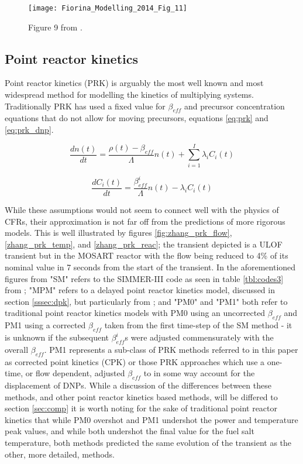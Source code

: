 \documentclass[review]{elsarticle}
\begin{document}
\begin{figure}[h]
   \centering
   \texttt{[image: Fiorina\_Modelling\_2014\_Fig\_11]}
   \caption{Figure 9 from \cite{fiorina_modelling_2014}.} 
   \label{fig:fiorina_msfr_ulof}
\end{figure}

\subsection{Point reactor kinetics} \label{ssec:prk}
Point reactor kinetics (PRK) is arguably the most well known and most widespread
method for modelling the kinetics of multiplying systems. Traditionally PRK
has used a fixed value for $\beta_{eff}$ and precursor concentration equations
that do not allow for moving precursors, equations \ref{eq:prk} and
\ref{eq:prk_dnp}.

\begin{equation}
    \label{eq:prk}
    \frac{dn(t)}{dt} = \frac{\rho(t) - \beta_{eff}}{\Lambda} n(t) +
     \sum_{i = 1}^{I} \lambda_{i} C_{i}(t)
\end{equation}

\begin{equation}
    \label{eq:prk_dnp}
    \frac{dC_{i}(t)}{dt} = \frac{\beta_{eff}^{i}}{\Lambda} n(t) -
        \lambda_{i} C_{i}(t)
\end{equation}

While these assumptions would not seem to connect well
with the physics of CFRs, their approximation is not far off from the
predictions of more rigorous models. This is well illustrated by figures
\ref{fig:zhang_prk_flow}, \ref{zhang_prk_temp}, and \ref{zhang_prk_reac};
the transient depicted is a ULOF transient but in the MOSART reactor with the
flow being reduced to 4\% of its nominal value in 7 seconds from the start
of the transient. In
the aforementioned figures from \cite{zhang_comparison_2009} "SM" refers
to the SIMMER-III code as seen in table \ref{tbl:codes3} from
\cite{rineiski_kinetics_2005}; "MPM" refers to a delayed point reactor kinetics
model, discussed in section \ref{sssec:dpk}, but particularly from
\cite{suzuki_reactivity-initiated-accident_2008}; and "PM0" and "PM1" both
refer to traditional point reactor kinetics models with PM0 using an
uncorrected $\beta_{eff}$ and PM1 using a corrected $\beta_{eff}$ taken from
the first time-step of the SM method - it is unknown if the subsequent
$\beta_{eff}^{i}$s were adjusted commensurately with the overall $\beta_{eff}$.
PM1 represents a sub-class of PRK methods referred to in this paper as
corrected point kinetics (CPK) or those PRK approaches which use a one-time, or
flow dependent, adjusted $\beta_{eff}$ to in some way account for the
displacement of DNPs.
While a discussion of the differences between these methods, and other point
reactor kinetics based methods, will be differed to section \ref{sec:comp}
it is worth noting for the sake of traditional point reactor kinetics that
while PM0 overshot and PM1 undershot the power and temperature peak values, and
while both undershot the final value for the fuel salt temperature, both methods
predicted the same evolution of the transient as the other, more detailed,
methods.
\end{document}
